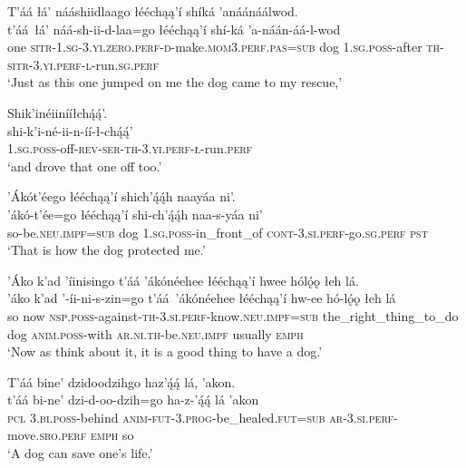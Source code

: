 \ea\label{ex:text6-15-12}
T’áá łá’ nááshiidlaago łééchąą’í shíká ’anáánáálwod.\\
\gll t’áá~{łá’}	náá-sh-ii-d-laa=go	łééchąą’í	shí-ká	’a-náán-áá-l-wod\\
     one	\textsc{sitr}-1.\textsc{sg}-3.\textsc{yi}.\textsc{zero}.\textsc{perf}-\textsc{d}-make.\textsc{mom}3.\textsc{perf}.\textsc{pas}=\textsc{sub}	dog	1.\textsc{sg}.\textsc{poss}-after	\textsc{th}-\textsc{sitr}-3.\textsc{yi}.\textsc{perf}-\textsc{l}-run.\textsc{sg}.\textsc{perf}\\
\glt `Just as this one jumped on me the dog came to my rescue,'
\z

\ea\label{ex:text6-15-13}
Shik’inéiinííłchą́ą́’.\\
\gll shi-k’i-né-ii-n-íí-ł-chą́ą́’\\
     1.\textsc{sg}.\textsc{poss}-off-\textsc{rev}-\textsc{ser}-\textsc{th}-3.\textsc{yi}.\textsc{perf}-\textsc{ł}-run.\textsc{perf}\\
\glt `and drove that one off too.'
\z

\ea\label{ex:text6-15-14}
’Ákót’éego łééchąą’í shich’ą́ą́h naayáa ni’.\\
\gll ’ákó-t’ée=go	łééchąą’í	shi-ch’ą́ą́h	naa-s-yáa	ni’\\
     so-be.\textsc{neu}.\textsc{impf}=\textsc{sub}	dog	1.\textsc{sg}.\textsc{poss}-in\_front\_of	\textsc{cont}-3.\textsc{si}.\textsc{perf}-go.\textsc{sg}.\textsc{perf}	\textsc{pst}\\
\glt `That is how the dog protected me.'
\z

\ea\label{ex:text6-15-15}
’Áko k’ad ’íinisingo t’áá ’ákónéehee łééchąą’í hwee hólǫ́ǫ łeh lá.\\
\gll ’áko	k’ad	’-íi-ni-s-zin=go	t’áá~{’ákónéehee}	łééchąą’í	hw-ee	hó-lǫ́ǫ	łeh	lá\\
     so	now	\textsc{nsp}.\textsc{poss}-against-\textsc{th}-3.\textsc{si}.\textsc{perf}-know.\textsc{neu}.\textsc{impf}=\textsc{sub}	the\_right\_thing\_to\_do	dog	\textsc{anim}.\textsc{poss}-with	\textsc{ar}.\textsc{ni}.\textsc{th}-be.\textsc{neu}.\textsc{impf}	usually	\textsc{emph}\\
\glt `Now as think about it, it is a good thing to have a dog.'
\z

\ea\label{ex:text6-15-16}
T’áá bine’ dzidoodzihgo haz’ą́ą́ lá, ’akon.\\
\gll t’áá	bi-ne’	dzi-d-oo-dzih=go	ha-z-’ą́ą́	lá	’akon\\
     \textsc{pcl}	3.\textsc{bi}.\textsc{poss}-behind	\textsc{anim}-\textsc{fut}-3.\textsc{prog}-be\_healed.\textsc{fut}=\textsc{sub}	\textsc{ar}-3.\textsc{si}.\textsc{perf}-move.\textsc{sro}.\textsc{perf}	\textsc{emph}	so\\
\glt `A dog can save one's life.'
\z

